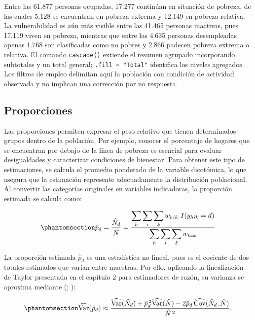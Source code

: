 \documentclass[
  spanish,
  11pt,
  letterpaper,
  oneside,
  open=any]{scrbook}
\begin{document}
Entre las 61.877 personas ocupadas, 17.277 continúan en situación de
pobreza, de las cuales 5.128 se encuentran en pobreza extrema y 12.149
en pobreza relativa. La vulnerabilidad es aún más visible entre las
41.465 personas inactivas, pues 17.119 viven en pobreza, mientras que
entre las 4.635 personas desempleadas apenas 1.768 son clasificadas como
no pobres y 2.866 padecen pobreza extrema o relativa. El comando
\texttt{cascade()} extiende el resumen agrupado incorporando subtotales
y un total general; \texttt{.fill\ =\ "Total"} identifica los niveles
agregados. Los filtros de empleo delimitan aquí la población con
condición de actividad observada y no implican una corrección por no
respuesta.

\subsection{Proporciones}\label{estimacion-de-proporciones}

Las proporciones permiten expresar el peso relativo que tienen
determinados grupos dentro de la población. Por ejemplo, conocer el
porcentaje de hogares que se encuentran por debajo de la línea de
pobreza es esencial para evaluar desigualdades y caracterizar
condiciones de bienestar. Para obtener este tipo de estimaciones, se
calcula el promedio ponderado de la variable dicotómica, lo que asegura
que la estimación represente adecuadamente la distribución poblacional.
Al convertir las categorías originales en variables indicadoras, la
proporción estimada se calcula como:

\begin{equation}\protect\phantomsection\label{eq-proporcion-dominio}{
\hat{p}_d = \frac{\hat{N}_d}{\hat{N}} = \frac{\displaystyle\sum_{h} \sum_{i} \sum_{k} w_{hik} \ I(y_{hik}=d)} {\displaystyle\sum_{h} \sum_{i} \sum_{k} w_{hik}}
}\end{equation}

La proporción estimada \(\hat{p}_d\) es una estadística no lineal, pues
es el cociente de dos totales estimados que varían entre muestras. Por
ello, aplicando la linealización de Taylor presentada en el capítulo 2
para estimadores de razón, su varianza se aproxima mediante
(;
):

\begin{equation}\protect\phantomsection\label{eq-varianza-proporcion}{
\widehat{\operatorname{Var}}(\hat{p}_d)
\approx
\frac{
\widehat{\operatorname{Var}}(\hat{N}_d)
+\hat{p}_d^{\,2}\widehat{\operatorname{Var}}(\hat{N})
-2\hat{p}_d\,\widehat{\operatorname{Cov}}(\hat{N}_d,\hat{N})
}{\hat{N}^{\,2}}.
}\end{equation}
\end{document}
